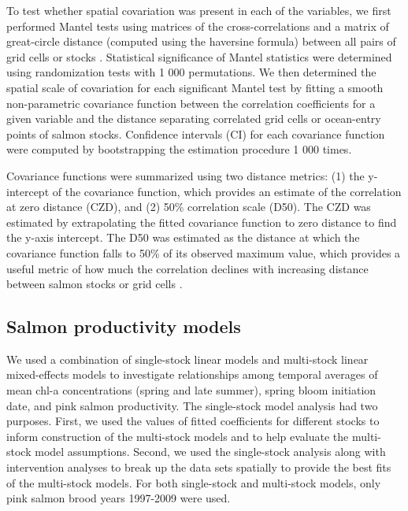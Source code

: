 To test whether spatial covariation was present in each of the variables, we
first performed Mantel tests using matrices of the cross-correlations and a
matrix of great-circle distance (computed using the haversine formula) between
all pairs of grid cells or stocks \citep{Legendre1998a, Koenig1999a}.
Statistical significance of Mantel statistics were determined using
randomization tests with 1 000 permutations. We then determined the spatial
scale of covariation for each significant Mantel test by fitting a smooth
non-parametric covariance function \citep{Bjornstad2001a} between the
correlation coefficients for a given variable and the distance separating
correlated grid cells or ocean-entry points of salmon stocks. Confidence
intervals (CI) for each covariance function were computed by bootstrapping the
estimation procedure 1 000 times.

Covariance functions were summarized using two distance metrics: (1) the
y-intercept of the covariance function, which provides an estimate of the
correlation at zero distance (CZD), and (2) 50\% correlation scale (D50). The
CZD was estimated by extrapolating the fitted covariance function to zero
distance to find the y-axis intercept. The D50 was estimated as the distance at
which the covariance function falls to 50\% of its observed maximum value, which
provides a useful metric of how much the correlation declines with increasing
distance between salmon stocks or grid cells \citep{Mueter2002b}.

\subsection{Salmon productivity models}

We used a combination of single-stock linear models and multi-stock linear
mixed-effects models to investigate relationships among temporal averages of
mean chl-a concentrations (spring and late summer), spring bloom initiation
date, and pink salmon productivity. The single-stock model analysis had two
purposes. First, we used the values of fitted coefficients for different stocks
to inform construction of the multi-stock models and to help evaluate the
multi-stock model assumptions. Second, we used the single-stock analysis along
with intervention analyses to break up the data sets spatially to provide the
best fits of the multi-stock models. For both single-stock and multi-stock
models, only pink salmon brood years 1997-2009 were used.

